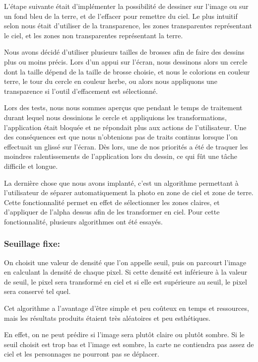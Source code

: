 \documentclass{report}
\begin{document}
L'étape suivante était d'implémenter la possibilité de dessiner sur
l'image ou sur un fond bleu de la terre, et de l’effacer pour remettre
du ciel. Le plus intuitif selon nous était d'utiliser de la
transparence, les zones transparentes représentant le ciel, et les zones
non transparentes représentant la terre.

Nous avons décidé d'utiliser
plusieurs tailles de brosses afin de faire des dessins plus ou moins
précis. Lors d’un appui sur l’écran, nous dessinons alors un cercle
dont la taille dépend de la taille de brosse choisie, et nous le
colorions en couleur terre, le tour du cercle en couleur herbe, ou alors
nous appliquons une transparence si l’outil d’effacement est
sélectionné.
\bigskip

Lors des tests, nous nous sommes aperçus que pendant le temps de
traitement durant lequel nous dessinions le cercle et appliquions les
transformations, l’application était bloquée et ne répondait plus aux
actions de l’utilisateur. Une des conséquences est que nous n’obtenions
pas de traits continus lorsque l’on effectuait un glissé sur l’écran.
Dès lors, une de nos priorités a été de traquer les moindres
ralentissements de l’application lors du dessin, ce qui fût une tâche
difficile et longue.
\bigskip


La dernière chose que nous avons implanté, c’est un algorithme
permettant à l’utilisateur de séparer automatiquement la photo en zone
de ciel et zone de terre. Cette fonctionnalité permet en effet de
sélectionner les zones claires, et d’appliquer de l’alpha dessus afin de
les transformer en ciel. Pour cette fonctionnalité, plusieurs
algorithmes ont été essayés.

\subsubsection{Seuillage fixe:}

On choisit une valeur de densité que l’on appelle seuil, puis on
parcourt l’image en calculant la densité de chaque pixel. Si cette
densité est inférieure à la valeur de seuil, le pixel sera transformé
en ciel et si elle est supérieure au seuil, le pixel sera conservé tel
quel.
\bigskip

Cet algorithme a l’avantage d’être simple et peu coûteux en temps et
ressources, mais les résultats produits étaient très aléatoires et peu
esthétiques.

En effet, on ne peut prédire si l’image sera plutôt claire
ou plutôt sombre. Si le seuil choisit est trop bas et l’image est
sombre, la carte ne contiendra pas assez de ciel et les personnages ne
pourront pas se déplacer.
\end{document}
